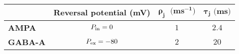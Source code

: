 \begin{tabular}{l|c|c|c|}
    \cline{2-4}
    \textbf{}                                                     & \cellcolor{main-color}\textbf{Reversal potential (mV)} & \cellcolor{main-color}\textbf{$\pmb{\rho_{j} \; \text{ (} ms^{-1} \text{)}}$} & \cellcolor{main-color}\textbf{$\pmb{\tau_{j} \text{ (} ms \text{)}}$} \\ \hline
    \multicolumn{1}{|l|}{\cellcolor{main-color}\textbf{AMPA}}   & $P_{\mathrm{in}} = 0$                                             & $1$                                                                              & $2.4$                                                                       \\ \hline
    \multicolumn{1}{|l|}{\cellcolor{main-color}\textbf{GABA-A}} & $P_{\mathrm{ex}} = -80$                                           & $2$                                                                              & $20$                                                                        \\ \hline
\end{tabular}